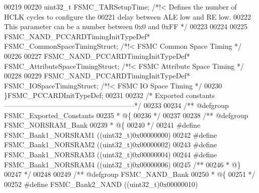 \begin{DoxyCode}
00219 
00220   uint32\_t FSMC_TARSetupTime;   \textcolor{comment}{/*!< Defines the number of HCLK cycles to configure the}
00221 \textcolor{comment}{                                     delay between ALE low and RE low.}
00222 \textcolor{comment}{                                     This parameter can be a number between 0x0 and 0xFF */}
00223 
00224 
00225   FSMC\_NAND\_PCCARDTimingInitTypeDef*  FSMC_CommonSpaceTimingStruct; \textcolor{comment}{/*!< FSMC Common Space Timing */}
00226 
00227   FSMC\_NAND\_PCCARDTimingInitTypeDef*  FSMC_AttributeSpaceTimingStruct;  \textcolor{comment}{/*!< FSMC Attribute Space
       Timing */}
00228 
00229   FSMC\_NAND\_PCCARDTimingInitTypeDef*  FSMC_IOSpaceTimingStruct; \textcolor{comment}{/*!< FSMC IO Space Timing */}
00230 \}FSMC\_PCCARDInitTypeDef;
00231 
00232 \textcolor{comment}{/* Exported constants --------------------------------------------------------*/}
00233 
00234 \textcolor{comment}{/** @defgroup FSMC\_Exported\_Constants}
00235 \textcolor{comment}{  * @\{}
00236 \textcolor{comment}{  */}
00237 
00238 \textcolor{comment}{/** @defgroup FSMC\_NORSRAM\_Bank }
00239 \textcolor{comment}{  * @\{}
00240 \textcolor{comment}{  */}
00241 \textcolor{preprocessor}{#}\textcolor{preprocessor}{define} \textcolor{preprocessor}{FSMC\_Bank1\_NORSRAM1}                      \textcolor{preprocessor}{(}\textcolor{preprocessor}{(}\textcolor{preprocessor}{uint32\_t}\textcolor{preprocessor}{)}0x00000000\textcolor{preprocessor}{)}
00242 \textcolor{preprocessor}{#}\textcolor{preprocessor}{define} \textcolor{preprocessor}{FSMC\_Bank1\_NORSRAM2}                      \textcolor{preprocessor}{(}\textcolor{preprocessor}{(}\textcolor{preprocessor}{uint32\_t}\textcolor{preprocessor}{)}0x00000002\textcolor{preprocessor}{)}
00243 \textcolor{preprocessor}{#}\textcolor{preprocessor}{define} \textcolor{preprocessor}{FSMC\_Bank1\_NORSRAM3}                      \textcolor{preprocessor}{(}\textcolor{preprocessor}{(}\textcolor{preprocessor}{uint32\_t}\textcolor{preprocessor}{)}0x00000004\textcolor{preprocessor}{)}
00244 \textcolor{preprocessor}{#}\textcolor{preprocessor}{define} \textcolor{preprocessor}{FSMC\_Bank1\_NORSRAM4}                      \textcolor{preprocessor}{(}\textcolor{preprocessor}{(}\textcolor{preprocessor}{uint32\_t}\textcolor{preprocessor}{)}0x00000006\textcolor{preprocessor}{)}
00245 \textcolor{comment}{/**}
00246 \textcolor{comment}{  * @\}}
00247 \textcolor{comment}{  */}
00248 
00249 \textcolor{comment}{/** @defgroup FSMC\_NAND\_Bank }
00250 \textcolor{comment}{  * @\{}
00251 \textcolor{comment}{  */}
00252 \textcolor{preprocessor}{#}\textcolor{preprocessor}{define} \textcolor{preprocessor}{FSMC\_Bank2\_NAND}                          \textcolor{preprocessor}{(}\textcolor{preprocessor}{(}\textcolor{preprocessor}{uint32\_t}\textcolor{preprocessor}{)}0x00000010\textcolor{preprocessor}{)}

\end{DoxyCode}
